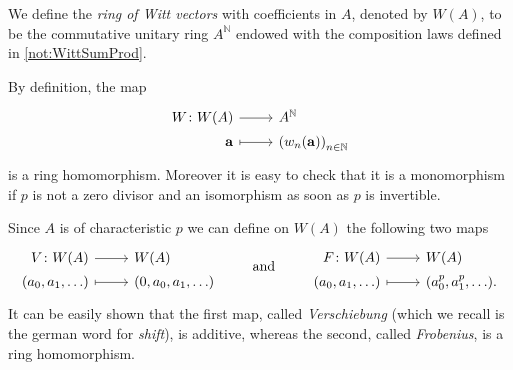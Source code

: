 \begin{defn}
	We define the {\em ring of Witt vectors} with coefficients in $A$,
	denoted by $W(A)$, to be the commutative unitary ring $A^{\mathbb{N}}$
	endowed with the composition laws defined in \cref{not:WittSumProd}.
\end{defn}


\begin{rem}[]
	By definition, the map
	\begin{equation*}
	\begin{tikzcd}[row sep = 0ex
		,/tikz/column 1/.append style={anchor=base east}
		,/tikz/column 2/.append style={anchor=base west}]
		W\colon W(A) \arrow[r, "", rightarrow] &
		A^{\mathbb{N}} \\
		\mathbf{a} \arrow[r, "", mapsto] & 
		\left( w_n(\mathbf{a}) \right)_{n \in \mathbb{N}}
	\end{tikzcd}
	\end{equation*} 
	is a ring homomorphism.
	Moreover it is easy to check that it is 
	a monomorphism if $p$ is not a zero divisor and
	an isomorphism as soon as $p$ is invertible. 
\end{rem}


\begin{defn}
	Since $A$ is of characteristic $p$ we can define on $W(A)$ the following two
	maps
	\begin{equation*}
	\begin{tikzcd}[row sep = 0ex
		,/tikz/column 1/.append style={anchor=base east}
		,/tikz/column 2/.append style={anchor=base west}]
		V\colon W(A) \arrow[r, "", rightarrow] &
		W(A) \\
		(a_0, a_1, \ldots) \arrow[r, "", mapsto] & 
		(0, a_0, a_1, \ldots)
	\end{tikzcd}
	\qquad \text{ and } \qquad
	\begin{tikzcd}[row sep = 0ex
		,/tikz/column 1/.append style={anchor=base east}
		,/tikz/column 2/.append style={anchor=base west}]
		F\colon W(A) \arrow[r, "", rightarrow] &
		W(A) \\
		(a_0, a_1, \ldots) \arrow[r, "", mapsto] & 
		(a_0^p, a_1^p, \ldots)
	.\end{tikzcd}
	\end{equation*} 
	It can be easily shown that the first map, called {\em Verschiebung}
	(which we recall is the german word for {\em shift}), 
	is additive, whereas the second, called {\em Frobenius},
	is a ring homomorphism.
\end{defn}


